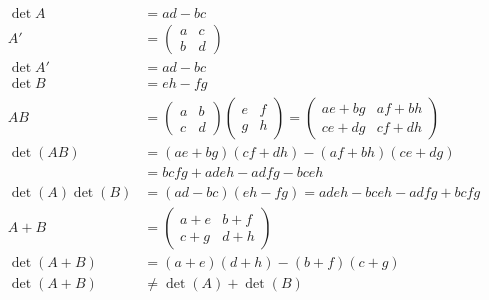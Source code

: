 \documentclass[letterpaper, 11pt]{article}
\newcommand{\1}{\mathds{1}}	%
\theoremstyle{definition}
\begin{document}
\begin{align*}
    \det A            & = ad-bc                                       \\
    A'                & = \begin{pmatrix}
                              a & c \\
                              b & d
                          \end{pmatrix}                              \\
    \det A'           & = ad-bc                                       \\
    \det B            & = eh-fg                                       \\
    AB                & = \begin{pmatrix}
                              a & b \\
                              c & d
                          \end{pmatrix}\begin{pmatrix}
                                           e & f \\
                                           g & h
                                       \end{pmatrix} = \begin{pmatrix}
                                                           ae+bg & af+bh \\
                                                           ce+dg & cf+dh
                                                       \end{pmatrix} \\
    \det (AB)         & = (ae+bg)(cf+dh)- (af+bh)(ce+dg)              \\
                      & = bcfg + adeh - adfg - bceh                   \\
    \det (A) \det (B) & = (ad-bc)(eh-fg) = adeh - bceh - adfg + bcfg  \\
    A + B             & = \begin{pmatrix}
                              a+e & b+f \\
                              c+g & d+h
                          \end{pmatrix}                              \\
    \det (A+B)        & = (a+e)(d+h) - (b+f)(c+g)                     \\
    \det (A+B)        & \neq \det (A) + \det (B)
\end{align*}
\end{document}

